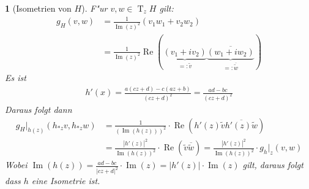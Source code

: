 \documentclass[paper=A4, twoside, chapterprefix=true, bibliography=totoc, headsepline]{scrbook}
\DeclareMathOperator{\T}{T} %
\renewcommand{\Re}{\ensuremath{\operatorname{Re}}}
\renewcommand{\Im}{\ensuremath{\operatorname{Im}}}
\theoremstyle{plain}
\theoremstyle{nonumberplain}
\theoremstyle{empty}
\newtheorem{emptythm}{}%
\theoremstyle{break}
\begin{document}
\begin{emptythm}[Isometrien von $H$]
F"ur $v, w \in \T_zH$ gilt:
\begin{align*}
	g_H(v, w) &= \frac{1}{\Im(z)^2} (v_1 w_1 + v_2 w_2) \\
	&= \frac{1}{\Im(z)^2} \Re(\underbrace{(v_1 + iv_2)}_{=: \tilde{v}} \overline{\underbrace{(w_1 + i w_2)}_{=:\overline{\tilde{w}}}})
\end{align*}
Es ist
\begin{align*}
	h'(x) = \frac{a(cz + d) - c(az + b)}{(cz + d)^2} = \frac{ad - bc}{(cz + d)^2}
\end{align*}
Daraus folgt dann
\begin{align*}
	g_H|_{h(z)}(h_{*z}v, h_{*z}w) &= \frac{1}{(\Im(h(z)))^2} \cdot \Re(h'(z) \tilde{v} \overline{h'(z) \tilde{w}}) \\
	&= \frac{|h'(z)|^2}{\Im(h(z))^2} \cdot \Re(\tilde{v} \overline{\tilde{w}}) = \frac{|h'(z)|^2}{\Im(h(z))^2} \cdot g_h|_z(v,w)
\end{align*}
Wobei $\Im(h(z)) = \frac{ad - bc}{|cz + d|^2} \cdot \Im(z) = |h'(z)| \cdot \Im(z)$ gilt, daraus folgt dass $h$ eine Isometrie ist.
\end{emptythm}
\end{document}

